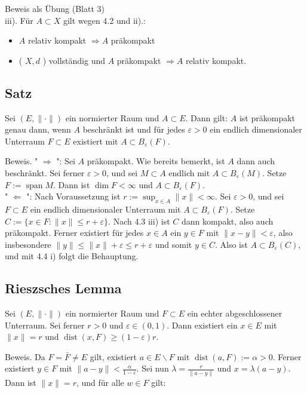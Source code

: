 \documentclass[10pt, letterpaper]{article}
\begin{document}
Beweis als Übung (Blatt 3)\\
iii). Für $A \subset X$ gilt wegen 4.2 und ii).:

\begin{itemize}
  \item $A$ relativ kompakt $\Longrightarrow A$ präkompakt
  \item ( $X, d$ ) vollständig und $A$ präkompakt $\Longrightarrow A$ relativ kompakt.
\end{itemize}

\subsection*{Satz}
Sei $(E,\|\cdot\|)$ ein normierter Raum und $A \subset E$. Dann gilt: $A$ ist präkompakt genau dann, wenn $A$ beschränkt ist und für jedes $\varepsilon>0$ ein endlich dimensionaler Unterraum $F \subset E$ existiert mit $A \subset B_{\varepsilon}(F)$.

Beweis. " $\Longrightarrow$ ": Sei $A$ präkompakt. Wie bereits bemerkt, ist $A$ dann auch beschränkt. Sei ferner $\varepsilon>0$, und sei $M \subset A$ endlich mit $A \subset B_{\varepsilon}(M)$. Setze $F:=\operatorname{span} M$. Dann ist $\operatorname{dim} F<\infty$ und $A \subset B_{\varepsilon}(F)$.\\
" $\Longleftarrow$ ": Nach Voraussetzung ist $r:=\sup _{x \in A}\|x\|<\infty$. Sei $\varepsilon>0$, und sei $F \subset E$ ein endlich dimensionaler Unterraum mit $A \subset B_{\varepsilon}(F)$. Setze $C:=\{x \in F:\|x\| \leq r+\varepsilon\}$. Nach 4.3 iii) ist $C$ dann kompakt, also auch präkompakt. Ferner existiert für jedes $x \in A$ ein $y \in F$ mit $\|x-y\|<\varepsilon$, also insbesondere $\|y\| \leq\|x\|+\varepsilon \leq r+\varepsilon$ und somit $y \in C$. Also ist $A \subset B_{\varepsilon}(C)$, und mit 4.4 i) folgt die Behauptung.

\subsection*{Rieszsches Lemma}
Sei $(E,\|\cdot\|)$ ein normierter Raum und $F \subset E$ ein echter abgeschlossener Unterraum. Sei ferner $r>0$ und $\varepsilon \in(0,1)$. Dann existiert ein $x \in E$ mit $\|x\|=r$ und $\operatorname{dist}(x, F) \geq(1-\varepsilon) r$.

Beweis. Da $F=\bar{F} \neq E$ gilt, existiert $a \in E \backslash F$ mit $\operatorname{dist}(a, F):=\alpha>0$. Ferner existiert $y \in F$ mit $\|a-y\|<\frac{\alpha}{1-\varepsilon}$. Sei nun $\lambda=\frac{r}{\|a-y\|}$ und $x=\lambda(a-y)$. Dann ist $\|x\|=r$, und für alle $w \in F$ gilt:
\end{document}
